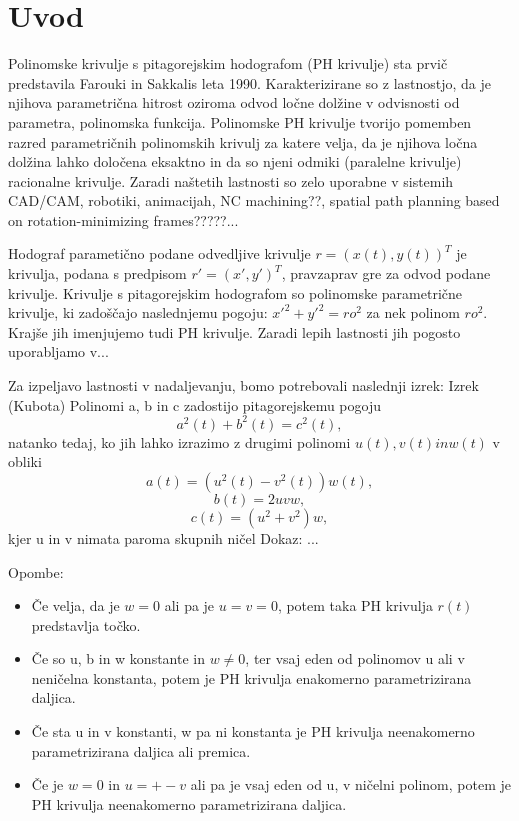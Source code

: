 \documentclass[12pt]{article}
\begin{document}
\section{Uvod}
Polinomske krivulje s pitagorejskim hodografom (PH krivulje) sta prvič predstavila Farouki in Sakkalis leta 1990.
Karakterizirane so z lastnostjo, da je njihova parametrična hitrost oziroma odvod ločne dolžine v odvisnosti od parametra,
polinomska funkcija. Polinomske PH krivulje tvorijo pomemben razred parametričnih polinomskih krivulj
za katere velja, da je njihova ločna dolžina lahko določena eksaktno in da so njeni odmiki (paralelne krivulje) racionalne krivulje.
Zaradi naštetih lastnosti so zelo uporabne v sistemih CAD/CAM, robotiki, animacijah, NC machining??, spatial path planning based on rotation-minimizing frames?????...


Hodograf parametično podane odvedljive krivulje $r = (x(t), y(t))^T$ je krivulja, 
podana s predpisom $r' = (x', y')^T$, pravzaprav gre za odvod podane krivulje. 
Krivulje s pitagorejskim hodografom so polinomske parametrične krivulje, 
ki zadoščajo naslednjemu pogoju:
$x'^2 + y'^2 = ro^2$ za nek polinom $ro^2$.
Krajše jih imenjujemo tudi PH krivulje. 
Zaradi lepih lastnosti jih pogosto uporabljamo v...

Za izpeljavo lastnosti v nadaljevanju, bomo potrebovali naslednji izrek:
Izrek (Kubota)
Polinomi a, b in c zadostijo pitagorejskemu pogoju
$$a^2(t) + b^2(t) = c^2(t),$$
natanko tedaj, ko jih lahko izrazimo z drugimi polinomi $u(t), v(t) in w(t)$ v obliki
$$a(t) = (u^2(t) - v^2(t))w(t),$$
$$b(t) = 2uvw,$$
$$c(t) = (u^2 + v^2)w,$$
kjer u in v nimata paroma skupnih ničel
Dokaz: ...

Opombe:
\begin{itemize}
	\item Če velja, da je $w=0$ ali pa je $u=v=0$, potem taka PH krivulja $r(t)$ predstavlja točko.
	\item Če so u, b in w konstante in $w \neq 0$, ter vsaj eden od polinomov u ali v neničelna konstanta,
	potem je PH krivulja enakomerno parametrizirana daljica.
	\item Če sta u in v konstanti, w pa ni konstanta je PH krivulja neenakomerno parametrizirana daljica ali premica.
	\item Če je $w = 0$ in $u = +-v$ ali pa je vsaj eden od u, v ničelni polinom, 
	potem je PH krivulja neenakomerno parametrizirana daljica.
\end{itemize}
\end{document}
